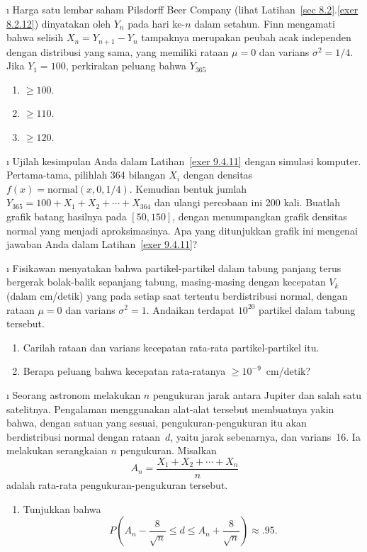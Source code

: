 \begin{LJSItem}
\i\label{exer 9.4.11} Harga satu lembar saham Pilsdorff Beer Company (lihat
Latihan~\ref{sec 8.2}.\ref{exer 8.2.12}) dinyatakan oleh $Y_n$ pada hari ke-$n$ dalam setahun.
Finn mengamati bahwa selisih $X_n = Y_{n + 1} - Y_n$ tampaknya merupakan peubah acak independen
dengan distribusi yang sama, yang memiliki rataan $\mu = 0$ dan varians $\sigma^2 = 1/4$.
Jika $Y_1 = 100$, perkirakan peluang bahwa $Y_{365}$
\begin{enumerate}
\item  ${} \geq 100$.

\item  ${} \geq 110$.

\item  ${} \geq 120$.
\end{enumerate}

\i\label{exer 9.4.12}  Ujilah kesimpulan Anda dalam Latihan~\ref{exer 9.4.11} dengan simulasi
komputer.  Pertama-tama, pilihlah 364 bilangan $X_i$ dengan densitas
$f(x) = \mbox {normal}(x,0,1/4)$.  Kemudian bentuk jumlah
$Y_{365} = 100 + X_1 + X_2 +\cdots+ X_{364}$ dan ulangi percobaan ini 200 kali.  Buatlah grafik
batang hasilnya pada $[50,150]$, dengan menumpangkan grafik densitas normal yang menjadi
aproksimasinya.  Apa yang ditunjukkan grafik ini mengenai jawaban Anda dalam
Latihan~\ref{exer 9.4.11}?

\i\label{exer 9.4.12.5}  Fisikawan menyatakan bahwa partikel-partikel dalam tabung panjang terus
bergerak bolak-balik sepanjang tabung, masing-masing dengan kecepatan $V_k$ (dalam cm/detik) yang
pada setiap saat tertentu berdistribusi normal, dengan rataan $\mu = 0$ dan varians
$\sigma^2 = 1$.  Andaikan terdapat $10^{20}$ partikel dalam tabung tersebut.
\begin{enumerate}
\item  Carilah rataan dan varians kecepatan rata-rata partikel-partikel itu.

\item  Berapa peluang bahwa kecepatan rata-ratanya ${} \geq
10^{-9}$~cm/detik?
\end{enumerate}

\i\label{exer 9.4.13}  Seorang astronom melakukan $n$ pengukuran jarak antara Jupiter dan salah
satu satelitnya.  Pengalaman menggunakan alat-alat tersebut membuatnya yakin bahwa, dengan satuan
yang sesuai, pengukuran-pengukuran itu akan berdistribusi normal dengan rataan~$d$, yaitu jarak
sebenarnya, dan varians~16.  Ia melakukan serangkaian $n$ pengukuran.  Misalkan
$$
A_n = \frac {X_1 + X_2 +\cdots+ X_n}n
$$
adalah rata-rata pengukuran-pengukuran tersebut.
\begin{enumerate}
\item  Tunjukkan bahwa
\[
P\left(A_n - \frac 8{\sqrt n} \leq d \leq A_n + \frac 8{\sqrt n}\right) \approx
.95.
\]


\end{enumerate}
\end{LJSItem}
